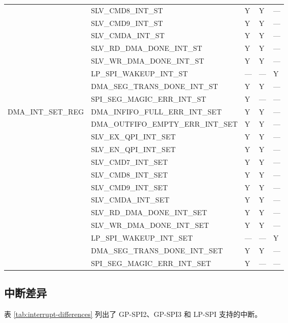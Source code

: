 \documentclass[main\_\_CN.tex]{subfiles}
\begin{document}
\begin{longtable}{|p{4.0cm}|p{6.0cm}|p{1.5cm}|p{1.5cm}|p{1.5cm}|}
& SLV\_CMD8\_INT\_ST & Y & Y & --- \\ \cline{2-5}
& SLV\_CMD9\_INT\_ST & Y & Y & --- \\ \cline{2-5}
& SLV\_CMDA\_INT\_ST & Y & Y & --- \\ \cline{2-5}
& SLV\_RD\_DMA\_DONE\_INT\_ST & Y & Y & --- \\ \cline{2-5}
& SLV\_WR\_DMA\_DONE\_INT\_ST & Y & Y & --- \\ \cline{2-5}
& LP\_SPI\_WAKEUP\_INT\_ST & --- & --- & Y \\ \cline{2-5}
& DMA\_SEG\_TRANS\_DONE\_INT\_ST & Y & Y & --- \\ \cline{2-5}
& SPI\_SEG\_MAGIC\_ERR\_INT\_ST & Y & --- & --- \\ \hline
\multirow{13}{*}{DMA\_INT\_SET\_REG} & DMA\_INFIFO\_FULL\_ERR\_INT\_SET & Y & Y & --- \\ \cline{2-5}
& DMA\_OUTFIFO\_EMPTY\_ERR\_INT\_SET & Y & Y & --- \\ \cline{2-5}
& SLV\_EX\_QPI\_INT\_SET & Y & Y & --- \\ \cline{2-5}
& SLV\_EN\_QPI\_INT\_SET & Y & Y & --- \\ \cline{2-5}
& SLV\_CMD7\_INT\_SET & Y & Y & --- \\ \cline{2-5}
& SLV\_CMD8\_INT\_SET & Y & Y & --- \\ \cline{2-5}
& SLV\_CMD9\_INT\_SET & Y & Y & --- \\ \cline{2-5}
& SLV\_CMDA\_INT\_SET & Y & Y & --- \\ \cline{2-5}
& SLV\_RD\_DMA\_DONE\_INT\_SET & Y & Y & --- \\ \cline{2-5}
& SLV\_WR\_DMA\_DONE\_INT\_SET & Y & Y & --- \\ \cline{2-5}
& LP\_SPI\_WAKEUP\_INT\_SET & --- & --- & Y \\ \cline{2-5}
& DMA\_SEG\_TRANS\_DONE\_INT\_SET & Y & Y & --- \\ \cline{2-5}
& SPI\_SEG\_MAGIC\_ERR\_INT\_SET & Y & --- & --- \\ \hline
\end{longtable}

\subsection{中断差异}

表 \ref{tab:interrupt-differences} 列出了 GP-SPI2、GP-SPI3 和 LP-SPI 支持的中断。
\end{document}
